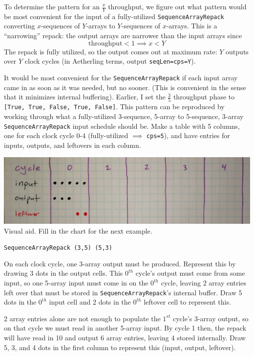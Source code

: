 \documentclass[12pt]{article}
\begin{document}
To determine the pattern for an $\frac{x}{Y}$ throughput, we figure
out what pattern would be most convenient for the input of a
fully-utilized \texttt{SequenceArrayRepack} converting $x$-sequences
of $Y$-arrays to $Y$-sequences of $x$-arrays. This is a ``narrowing''
repack: the output arrays are narrower than the input arrays since
\begin{equation*}
    \text{throughput}<1 \implies x<Y
\end{equation*}
The repack is fully utilized, so the output comes
out at maximum rate: $Y$ outputs over $Y$ clock cycles (in Aetherling
terms, output \texttt{seqLen=cps=Y}).

It would be most convenient for the \texttt{SequenceArrayRepack} if
each input array came in as soon as it was needed, but no sooner.
(This is convenient in the sense that it minimizes internal
buffering). Earlier, I set the $\frac{3}{5}$ throughput phase to
\texttt{[True, True, False, True, False]}. This pattern can be
reproduced by working through what a fully-utilized 3-sequence,
5-array to 5-sequence, 3-array \texttt{SequenceArrayRepack} input
schedule should be. Make a table with 5 columns, one for each clock
cycle 0-4 (fully-utilized $\implies$ \texttt{cps=5}), and have entries
for inputs, outputs, and leftovers in each column.

\begin{center}
\includegraphics[width=1.0\linewidth]{Figures/sorry-if-patronizing.jpg}
Visual aid. Fill in the chart for the next example.

\texttt{SequenceArrayRepack (3,5) (5,3)}
\end{center}

On each clock cycle, one 3-array output must be produced. Represent
this by drawing 3 dots in the output cells. This $0^{th}$ cycle's
output must come from some input, so one 5-array input must come in
on the $0^{th}$ cycle, leaving 2 array entries left over that must
be stored in \texttt{SequenceArrayRepack}'s internal buffer. Draw
5 dots in the $0^{th}$ input cell and 2 dots in the $0^{th}$
leftover cell to represent this.

2 array entries alone are not enough to populate the $1^{st}$ cycle's
3-array output, so on that cycle we must read in another 5-array
input. By cycle 1 then, the repack will have read in 10 and output 6
array entries, leaving 4 stored internally. Draw 5, 3, and 4 dots in
the first column to represent this (input, output, leftover).
\end{document}
